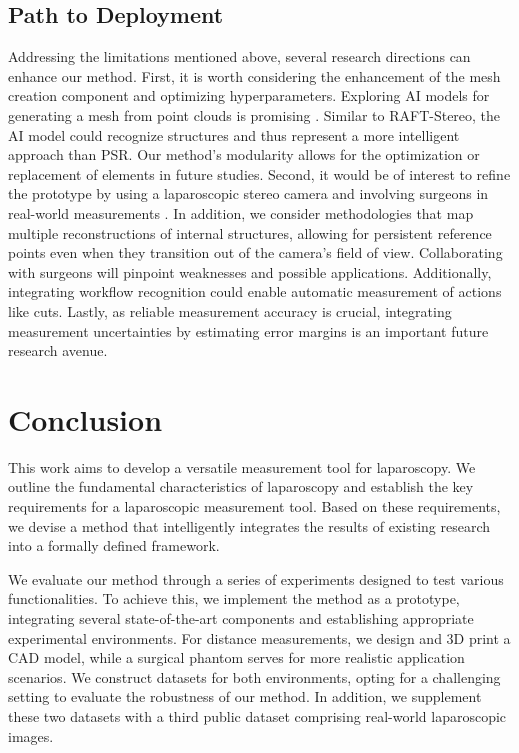 \documentclass[letterpaper]{article} %
\begin{document}
\subsection{Path to Deployment}

Addressing the limitations mentioned above, several research directions can enhance our method. First, it is worth considering the enhancement of the mesh creation component and optimizing hyperparameters. Exploring AI models for generating a mesh from point clouds is promising \cite{Miyauchi2022}. Similar to RAFT-Stereo, the AI model could recognize structures and thus represent a more intelligent approach than PSR. Our method's modularity allows for the optimization or replacement of elements in future studies. Second, it would be of interest to refine the prototype by using a laparoscopic stereo camera and involving surgeons in real-world measurements \cite{Dowrick2023}. In addition, we consider methodologies that map multiple reconstructions of internal structures, allowing for persistent reference points even when they transition out of the camera's field of view. Collaborating with surgeons will pinpoint weaknesses and possible applications. Additionally, integrating workflow recognition could enable automatic measurement of actions like cuts. Lastly, as reliable measurement accuracy is crucial, integrating measurement uncertainties by estimating error margins is an important future research avenue. %

\section{Conclusion}

This work aims to develop a versatile measurement tool for laparoscopy. We outline the fundamental characteristics of laparoscopy and establish the key requirements for a laparoscopic measurement tool. Based on these requirements, we devise a method that intelligently integrates the results of existing research into a formally defined framework.

We evaluate our method through a series of experiments designed to test various functionalities. To achieve this, we implement the method as a prototype, integrating several state-of-the-art components and establishing appropriate experimental environments. For distance measurements, we design and 3D print a CAD model, while a surgical phantom serves for more realistic application scenarios. We construct datasets for both environments, opting for a challenging setting to evaluate the robustness of our method. In addition, we supplement these two datasets with a third public dataset comprising real-world laparoscopic images.
\end{document}
